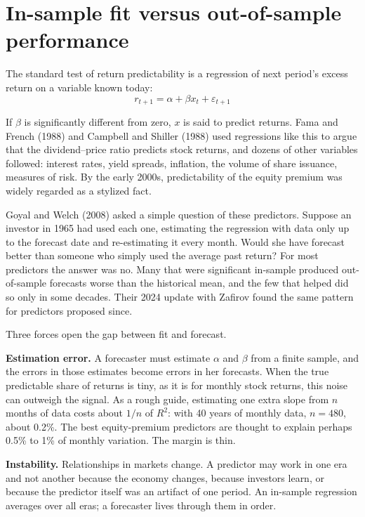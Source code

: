\section{In-sample fit versus out-of-sample performance}
\label{sec:05-insample}

The standard test of return predictability is a regression of next period's excess return on a variable known today:
\begin{equation}
  r_{t+1} = \alpha + \beta x_t + \varepsilon_{t+1}
  \label{eq:05-pred}
\end{equation}

If $\beta$ is significantly different from zero, $x$ is said to predict returns. Fama and French (1988) and Campbell and Shiller (1988) used regressions like this to argue that the dividend--price ratio predicts stock returns, and dozens of other variables followed: interest rates, yield spreads, inflation, the volume of share issuance, measures of risk. By the early 2000s, predictability of the equity premium was widely regarded as a stylized fact.

Goyal and Welch (2008) asked a simple question of these predictors. Suppose an investor in 1965 had used each one, estimating the regression with data only up to the forecast date and re-estimating it every month. Would she have forecast better than someone who simply used the average past return? For most predictors the answer was no. Many that were significant in-sample produced out-of-sample forecasts worse than the historical mean, and the few that helped did so only in some decades. Their 2024 update with Zafirov found the same pattern for predictors proposed since.

Three forces open the gap between fit and forecast.

\textbf{Estimation error.} A forecaster must estimate $\alpha$ and $\beta$ from a finite sample, and the errors in those estimates become errors in her forecasts. When the true predictable share of returns is tiny, as it is for monthly stock returns, this noise can outweigh the signal. As a rough guide, estimating one extra slope from $n$ months of data costs about $1/n$ of $R^2$: with 40 years of monthly data, $n = 480$, about 0.2\%. The best equity-premium predictors are thought to explain perhaps 0.5\% to 1\% of monthly variation. The margin is thin.

\textbf{Instability.} Relationships in markets change. A predictor may work in one era and not another because the economy changes, because investors learn, or because the predictor itself was an artifact of one period. An in-sample regression averages over all eras; a forecaster lives through them in order.

